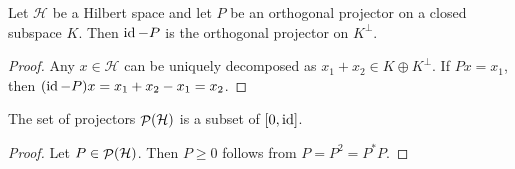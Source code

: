 \begin{proposition}
Let $\mathcal{H}$ be a Hilbert space and let $P$ be an orthogonal projector on a closed subspace $K$. Then $\operatorname{id}-P$ is the orthogonal projector on $K^\perp$.
\end{proposition}
\begin{proof}
Any $x\in \mathcal{H}$ can be uniquely decomposed as $x_1 + x_2\in K\oplus K^\perp$. If $Px = x_1$, then $(\operatorname{id} - P)x = x_1 +x_2 - x_1 = x_2$.
\end{proof}
\begin{corollary} \label{corollary:projectorsIn01}
The set of projectors $\mathop{\mathcal{P}}\nolimits(\mathcal{H})$ is a subset of $[0,\operatorname{id}]$.
\end{corollary}
\begin{proof}
Let $P\in\mathop{\mathcal{P}}\nolimits(\mathcal{H})$. Then $P\geq 0$ follows from $P = P^2 = P^*P$.
\end{proof}

